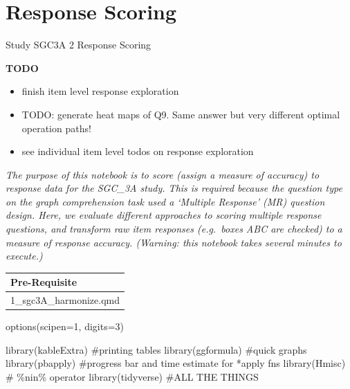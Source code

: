 \documentclass[
  letterpaper,
  DIV=11,
  numbers=noendperiod]{scrreprt}
\newenvironment{Shaded}{\begin{snugshade}}{\end{snugshade}}
\newcommand{\AttributeTok}[1]{\textcolor[rgb]{0.40,0.45,0.13}{#1}}
\newcommand{\CommentTok}[1]{\textcolor[rgb]{0.37,0.37,0.37}{#1}}
\newcommand{\DecValTok}[1]{\textcolor[rgb]{0.68,0.00,0.00}{#1}}
\newcommand{\FunctionTok}[1]{\textcolor[rgb]{0.28,0.35,0.67}{#1}}
\newcommand{\NormalTok}[1]{\textcolor[rgb]{0.00,0.23,0.31}{#1}}
\providecommand{\tightlist}{%
  \setlength{\itemsep}{0pt}\setlength{\parskip}{0pt}}\usepackage{longtable,booktabs,array}
\begin{document}
\hypertarget{sec-SGC3A-scoring}{%
\chapter{Response Scoring}\label{sec-SGC3A-scoring}}

Study SGC3A \textbar{} 2 Response Scoring

\hfill\break

\newpage

\textbf{TODO}

\begin{itemize}
\tightlist
\item
  finish item level response exploration
\item
  TODO: generate heat maps of Q9. Same answer but very different optimal
  operation paths!
\item
  see individual item level todos on response exploration
\end{itemize}

\emph{The purpose of this notebook is to score (assign a measure of
accuracy) to response data for the SGC\_3A study. This is required
because the question type on the graph comprehension task used a
`Multiple Response' (MR) question design. Here, we evaluate different
approaches to scoring multiple response questions, and transform raw
item responses (e.g.~boxes ABC are checked) to a measure of response
accuracy. (Warning: this notebook takes several minutes to execute.)}

\begin{longtable}[]{@{}l@{}}
\toprule()
Pre-Requisite \\
\midrule()
\endhead
1\_sgc3A\_harmonize.qmd \\
\bottomrule()
\end{longtable}

\begin{Shaded}
\begin{Highlighting}[]
\FunctionTok{options}\NormalTok{(}\AttributeTok{scipen=}\DecValTok{1}\NormalTok{, }\AttributeTok{digits=}\DecValTok{3}\NormalTok{)}

\FunctionTok{library}\NormalTok{(kableExtra) }\CommentTok{\#printing tables }
\FunctionTok{library}\NormalTok{(ggformula) }\CommentTok{\#quick graphs}
\FunctionTok{library}\NormalTok{(pbapply) }\CommentTok{\#progress bar and time estimate for *apply fns}
\FunctionTok{library}\NormalTok{(Hmisc) }\CommentTok{\# \%nin\% operator}
\FunctionTok{library}\NormalTok{(tidyverse) }\CommentTok{\#ALL THE THINGS}
\end{Highlighting}
\end{Shaded}
\end{document}

